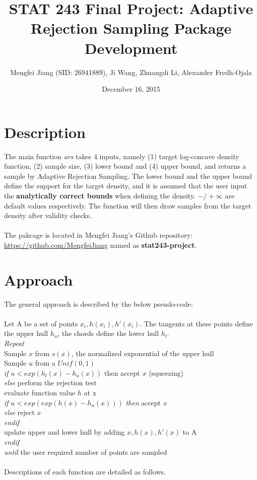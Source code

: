 \documentclass{article}\usepackage[]{graphicx}\usepackage[]{color}
\begin{document}
 

\title{STAT 243 Final Project: Adaptive Rejection Sampling Package Development}
\author{Mengfei Jiang (SID: 26941889), Ji Wang, Zhuangdi Li, Alexander Fredh-Ojala}
\date{December 16, 2015}

\maketitle

\tableofcontents

\newpage

\section{Description}
The main function \textit{ars} takes 4 inputs, namely (1) target log-concave density 
function, (2) sample size, (3) lower bound and (4) upper bound, and returns a sample by Adaptive 
Rejection Sampling. The lower bound and the upper bound define the support for the target
density, and it is assumed that the user input the \textbf{analytically correct 
bounds} when defining the density. $-/+ \infty$ are default values respectively.
The function will then draw samples from the target density after validity checks.\\
\\
The pakcage is located in Mengfei Jiang's Github repository: \url{https://github.com/MengfeiJiang}
named as \textbf{stat243-project}.

\section{Approach}
The general approach is described by the below pseudo-code:\\
\\
Let A be a set of points $x_i, h(x_i), h'(x_i)$. The tangents at these points
define the upper hull $h_u$, the chords define the lower hull $h_l$.\\
\textit{Repeat}\\
Sample $x$ from $s(x)$, the normalized exponential of the upper hull\\
Sample $u$ from a $Unif(0,1)$\\
\indent \textit{if} $u < exp(h_l(x) - h_u(x))$ then accept $x$ (squeezing)\\
\indent \textit{else} perform the rejection test\\
\indent \indent evaluate function value $h$ at x\\
\indent \indent \textit{if} $u < exp(exp(h(x) - h_u(x)))$ \textit{then} accept $x$\\
\indent \indent \textit{else} reject $x$\\
\indent \indent \textit{endif}\\
\indent \indent update upper and lower hull by adding {$x, h(x), h'(x)$} to A\\
\indent \textit{endif}\\
\textit{until} the user required number of points are sampled\\
\\
Descriptions of each function are detailed as follows.
\end{document}
